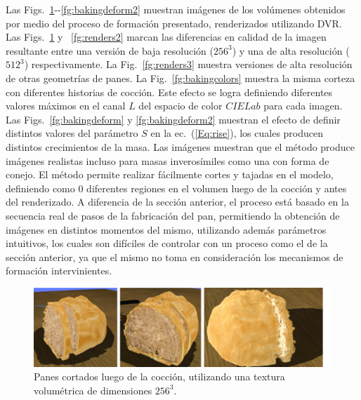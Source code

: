 Las Figs.~\ref{fg:renders}{-{}-}\ref{fg:bakingdeform2} muestran imágenes de los volúmenes obtenidos por medio del proceso de formación presentado, renderizados utilizando DVR.
Las Figs.~\ref{fg:renders} y ~\ref{fg:renders2} marcan las diferencias en calidad de la imagen resultante entre una versión de baja resolución ($256^{3}$) y una de alta resolución ($512^{3}$) respectivamente.
La Fig.~\ref{fg:renders3} muestra versiones de alta resolución de otras geometrías de panes.
La Fig.~\ref{fg:bakingcolors} muestra la misma corteza con diferentes historias de cocción.
Este efecto se logra definiendo diferentes valores máximos en el canal $L$ del espacio de color $CIELab$ para cada imagen.
Las Figs.~\ref{fg:bakingdeform} y \ref{fg:bakingdeform2} muestran el efecto de definir distintos valores del parámetro $S$ en la ec.~(\ref{Eq:rise}), los cuales producen distintos crecimientos de la masa.
Las imágenes muestran que el método produce imágenes realistas incluso para masas inverosímiles como una con forma de conejo.
El método permite realizar fácilmente cortes y tajadas en el modelo, definiendo como $0$ diferentes regiones en el volumen luego de la cocción y antes del renderizado.
A diferencia de la sección anterior, el proceso está basado en la secuencia real de pasos de la fabricación del pan, permitiendo la obtención de imágenes en distintos momentos del mismo, utilizando además parámetros intuitivos, los cuales son difíciles de controlar con un proceso como el de la sección anterior, ya que el mismo no toma en consideración los mecanismos de formación intervinientes.


\begin{figure}[!ht]
\begin{center}
\includegraphics[width=12cm]{figures/Fig10}
\caption{Panes cortados luego de la cocción, utilizando una textura volumétrica de dimensiones $256^{3}$.}
\label{fg:renders}
\end{center}
\end{figure}

